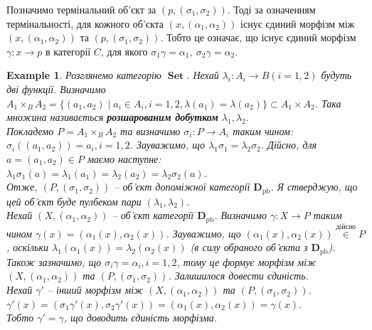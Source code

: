 \documentclass[a4paper, 10pt]{article}
\theoremstyle{theoremdd}
\newtheorem{example}[theorem]{Example}
\DeclareMathOperator{\Set}{\textbf{Set}}
\begin{document}
\noindent
Позначимо термінальний об'єкт за $(p,(\sigma_1,\sigma_2))$. Тоді за означенням термінальності, для кожного об'єкта $(x,(\alpha_1,\alpha_2))$ існує єдиний морфізм між $(x,(\alpha_1,\alpha_2))$ та $(p,(\sigma_1,\sigma_2))$. Тобто це означає, що існує єдиний морфізм $\gamma \colon x \to p$ в категорії $C$, для якого $\sigma_1 \gamma = \alpha_1,\ \sigma_2 \gamma = \alpha_2$. 
\begin{figure}[H]
\centering
{}
\end{figure}

\begin{example}
Розглянемо категорію $\Set$. Нехай $\lambda_i \colon A_i \to B (i = 1,2)$ будуть дві функції. Визначимо $A_1 \times_B A_2 = \{(a_1,a_2) \mid a_i \in A_i, i = 1,2, \lambda(a_1) = \lambda(a_2)\} \subset A_1 \times A_2$. Така множина називається \textbf{розшарованим добутком} $\lambda_1,\lambda_2$. \\
Покладемо $P = A_1 \times_B A_2$ та визначимо $\sigma_i \colon P \to A_i$ таким чином: $\sigma_i((a_1,a_2)) = a_i, i = 1,2$. Зауважимо, що $\lambda_1 \sigma_1 = \lambda_2 \sigma_2$. Дійсно, для $a = (a_1,a_2) \in P$ маємо наступне:\\
$\lambda_1 \sigma_1(a) = \lambda_1(a_1) = \lambda_2(a_2) = \lambda_2 \sigma_2(a)$.\\
Отже, $(P,(\sigma_1,\sigma_2))$ -- об'єкт допоміжної категорії $\textbf{D}_{\text{pb}}$. Я стверджую, що цей об'єкт буде пулбеком пари $(\lambda_1,\lambda_2)$.\\
Нехай $(X,(\alpha_1,\alpha_2))$ -- об'єкт категорії $\textbf{D}_{\text{pb}}$. Визначимо $\gamma \colon X \to P$ таким чином $\gamma(x) = (\alpha_1(x),\alpha_2(x))$. Зауважимо, що $(\alpha_1(x),\alpha_2(x)) \overset{\text{дійсно}}{\in} P$, оскільки $\lambda_1(\alpha_1(x)) = \lambda_2(\alpha_2(x))$ (в силу обраного об'єкта з $\textbf{D}_{\text{pb}}$). Також зазначимо, що $\sigma_i \gamma = \alpha_i, i = 1,2$, тому це формує морфізм між $(X,(\alpha_1,\alpha_2))$ та $(P,(\sigma_1,\sigma_2))$. Залишилося довести єдиність.\\
Нехай $\gamma'$ -- інший морфізм між $(X,(\alpha_1,\alpha_2))$ та $(P,(\sigma_1,\sigma_2))$.\\
$\gamma'(x) = (\sigma_1 \gamma'(x), \sigma_2 \gamma'(x)) = (\alpha_1(x),\alpha_2(x)) = \gamma(x)$.\\
Тобто $\gamma' = \gamma$, що доводить єдиність морфізма.
\end{example}
\end{document}
